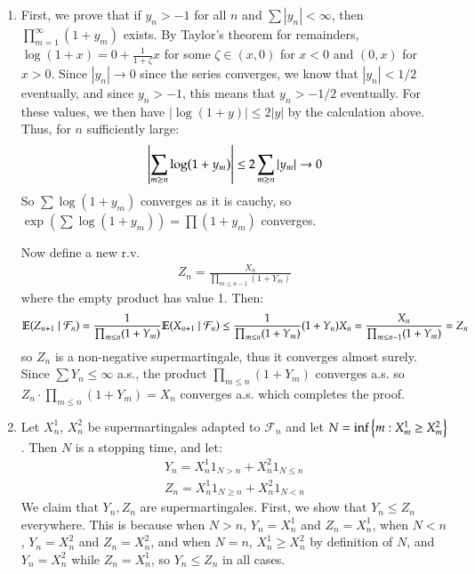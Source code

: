 \documentclass[12pt]{article}
\theoremstyle{definitionstyle}
\newcommand{\SET}[1]{\Set{\mskip-\medmuskip #1 \mskip-\medmuskip}}
\newcommand{\1}{\mathds 1}
\newcommand{\E}{\mathbb E \qty}
\begin{document}
\begin{enumerate}
        \item First, we prove that if $y_n > -1$ for all $n$ and $\sum |y_n| < \infty$, then $\prod_{m=1}^\infty (1+y_m)$ exists. By Taylor's theorem for remainders, $\log(1+x) = 0 + \frac{1}{1+\zeta} x$ for some $\zeta \in (x, 0)$ for $x < 0$ and $(0, x)$ for $x > 0$. Since $|y_n| \to 0$ since the series converges, we know that $|y_n| < 1/2$ eventually, and since $y_n > -1$, this means that $y_n > -1/2$ eventually. For these values, we then have $|\log(1+y)| \leq 2|y|$ by the calculation above. Thus, for $n$ sufficiently large:
        \begin{align*}
            \qty|\sum_{m \geq n} \log(1+y_m)| \leq 2\sum_{m \geq n} |y_m| \to 0
        \end{align*}
        So $\sum \log(1+y_m)$ converges as it is cauchy, so $\exp(\sum \log(1+y_m)) = \prod (1+y_m)$ converges.
        
        Now define a new r.v. 
        \begin{align*}
            Z_n = \frac{X_n}{\prod_{m \leq n-1} (1+Y_m)}
        \end{align*}
        where the empty product has value 1. Then:
        \begin{align*}
            \E(Z_{n+1} \mid \mathcal F_n) = \frac{1}{\prod_{m \leq n} (1+Y_m)} \E(X_{n+1} \mid \mathcal F_n) \leq \frac{1}{\prod_{m \leq n} (1+Y_m)} (1+Y_n)X_n = \frac{X_n}{\prod_{m \leq n-1} (1+Y_m)} = Z_n
        \end{align*}
        so $Z_n$ is a non-negative supermartingale, thus it converges almost surely. Since $\sum Y_n \leq \infty$ a.s., the product $\prod_{m \leq n} (1+Y_m)$ converges a.s. so $Z_n \cdot \prod_{m \leq n} (1+Y_m) = X_n$ converges a.s. which completes the proof.

        \item Let $X^1_n$, $X^2_n$ be supermartingales adapted to $\mathcal F_n$ and let $N = \inf\SET{m : X^1_m \geq X^2_m}$. Then $N$ is a stopping time, and let:
        \begin{align*}
            Y_n = X^1_n 1_{N > n} + X^2_n 1_{N \leq n} \\
            Z_n = X^1_n 1_{N \geq n} + X^2_n 1_{N < n}
        \end{align*}
        We claim that $Y_n, Z_n$ are supermartingales. First, we show that $Y_n \leq Z_n$ everywhere. This is because when $N > n$, $Y_n = X^1_n$ and $Z_n = X^1_n$, when $N < n$, $Y_n = X^2_n$ and $Z_n = X^2_n$, and when $N = n$, $X^1_n \geq X^2_n$ by definition of $N$, and $Y_n = X^2_n$ while $Z_n = X^1_n$, so $Y_n \leq Z_n$ in all cases. 


\end{enumerate}
\end{document}
